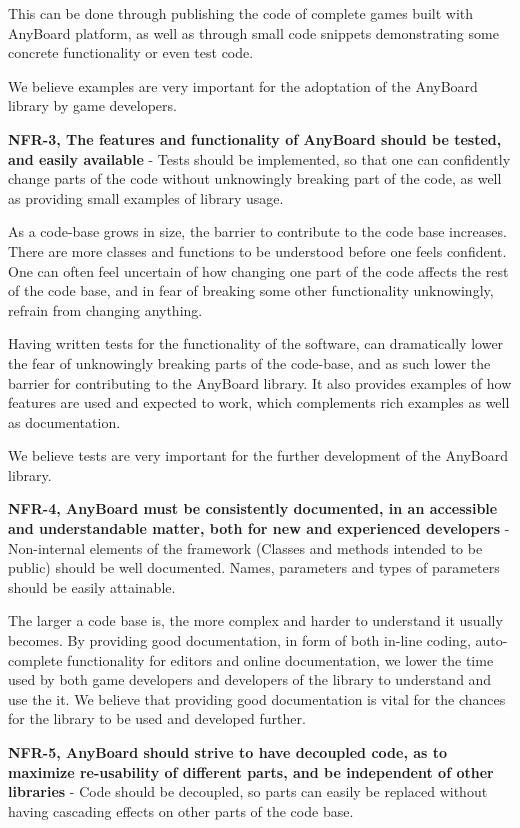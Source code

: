 This can be done through publishing the code of complete games built with AnyBoard platform, as well as through small code snippets demonstrating some concrete functionality or even test code.

We believe examples are very important for the adoptation of the AnyBoard library by game developers.

\textbf{NFR-3, The features and functionality of AnyBoard should be tested, and easily available} - Tests should be implemented, so that one can confidently change parts of the code without unknowingly breaking part of the code, as well as providing small examples of library usage.

As a code-base grows in size, the barrier to contribute to the code base increases. There are more classes and functions to be understood before one feels confident. One can often feel uncertain of how changing one part of the code affects the rest of the code base, and in fear of breaking some other functionality unknowingly, refrain from changing anything. 

Having written tests for the functionality of the software, can dramatically lower the fear of unknowingly breaking parts of the code-base, and as such lower the barrier for contributing to the AnyBoard library. It also provides examples of how features are used and expected to work, which complements rich examples as well as documentation.

We believe tests are very important for the further development of the AnyBoard library.

\textbf{NFR-4, AnyBoard must be consistently documented, in an accessible and understandable matter, both for new and experienced developers} - Non-internal elements of the framework (Classes and methods intended to be public) should be well documented. Names, parameters and types of parameters should be easily attainable. 

The larger a code base is, the more complex and harder to understand it usually becomes. By providing good documentation, in form of both in-line coding, auto-complete functionality for editors and online documentation, we lower the time used by both game developers and developers of the library to understand and use the it. 
We believe that providing good documentation is vital for the chances for the library to be used and developed further.

\textbf{NFR-5, AnyBoard should strive to have decoupled code, as to maximize re-usability of different parts, and be independent of other libraries} - Code should be decoupled, so parts can easily be replaced without having cascading effects on other parts of the code base. 

